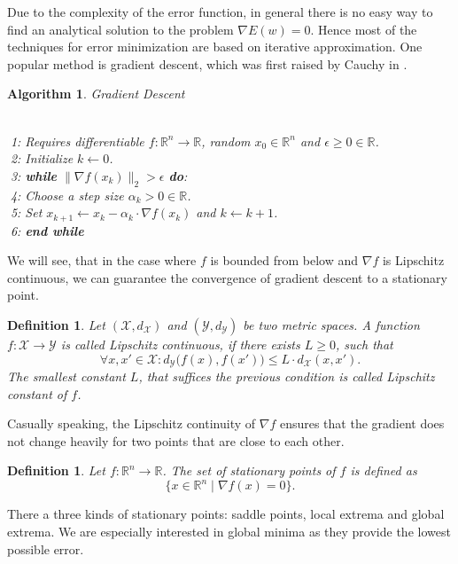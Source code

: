 \documentclass[11pt, a4paper]{article}
\newtheorem{definition}[theorem]{Definition}
\newtheorem{algorithm}[theorem]{Algorithm}
\newcommand{\R}{\mathds{R}}
\newcommand{\X}{\mathcal{X}}
\newcommand{\Y}{\mathcal{Y}}
\begin{document}
Due to the complexity of the error function, in general there is no easy way to find an analytical solution to the problem $\nabla E(w) = 0$. Hence most of the techniques for error minimization are based on iterative approximation. One popular method is gradient descent, which was first raised by Cauchy in \cite{GD}.

\begin{algorithm}
\caption{Gradient Descent} \ \\
\textcolor{white}{$\Big |$}1: Requires differentiable $f: \R^n \to \R$, random $x_0 \in \R^n$ and $\epsilon \geq 0 \in \R$. \\
\textcolor{white}{$\Big |$}2: Initialize $k \leftarrow 0$. \\
\textcolor{white}{$\Big |$}3: \textbf{while} $ \big \| \nabla f(x_k) \big \|_2 > \epsilon $ \textbf{do}:\\
\textcolor{white}{$\Big |$}4: \quad Choose a step size $\alpha_k > 0 \in \R$. \\
\textcolor{white}{$\Big |$}5: \quad Set $x_{k+1} \leftarrow x_k - \alpha_k \cdot \nabla f(x_k)$ and $k \leftarrow k+1$. \\
\textcolor{white}{$\Big |$}6: \textbf{end while}
\end {algorithm}

We will see, that in the case where $f$ is bounded from below and $\nabla f$ is Lipschitz continuous, we can guarantee the  convergence of gradient descent to a stationary point.

\begin{definition}
Let $(\X,d_{\X})$ and $(\Y, d_{\Y})$ be two metric spaces. A function $f: \X \to \Y$ is called Lipschitz continuous, if there exists $L \geq 0$, such that
\[ \forall x,x' \in \X : d_{\Y} \big ( f(x) , f(x') \big ) \leq L \cdot d_{\X}(x,x'). \]
The smallest constant $L$, that suffices the previous condition is called Lipschitz constant of $f$.
\end{definition}

Casually speaking, the Lipschitz continuity of $\nabla f$ ensures that the gradient does not change heavily for two points that are close to each other.

\begin{definition}
Let $f: \R^n \to \R$. The set of stationary points of $f$ is defined as
\[ \big \{ x \in \R^n \mid \nabla f(x) = 0 \big \}. \]
\end{definition}

There a three kinds of stationary points: saddle points, local extrema and global extrema. We are especially interested in global minima as they provide the lowest possible error.
\end{document}
